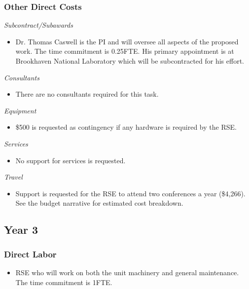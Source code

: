 \documentclass[12pt]{article}
\numberwithin{page}{section}
\begin{document}
\subsubsection{Other Direct Costs}
\textit{Subcontract/Subawards}
\begin{itemize}
\item Dr. Thomas Caswell is the PI and will oversee all aspects of the
  proposed work.  The time commitment is 0.25FTE.  His primary
  appointment is at Brookhaven National Laboratory which will be
  subcontracted for his effort.
\end{itemize}
\textit{Consultants}
\begin{itemize}
\item There are no consultants required for this task.
\end{itemize}
\textit{Equipment}
\begin{itemize}
\item \$500 is requested as contingency if any hardware is required by the RSE.
\end{itemize}
\textit{Services}
\begin{itemize}
\item No support for services is requested.
\end{itemize}
\textit{Travel}
\begin{itemize}
\item Support is requested for the RSE to attend two conferences a
  year (\$4,266).  See the budget narrative for estimated cost
  breakdown.
\end{itemize}
\subsection{Year 3}
\subsubsection{Direct Labor}
\begin{itemize}
\item RSE who will work on both the unit machinery and general
  maintenance.  The time commitment is 1FTE.
\end{itemize}
\end{document}
